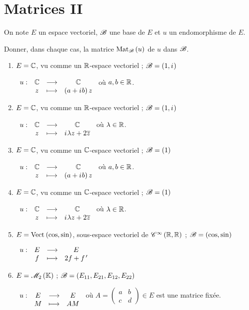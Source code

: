 \chapter{Matrices II}

\minitoc

\begin{exo}[Exercice 1]
On note \(E\) un espace vectoriel, \(\fami{B}\) une base de \(E\) et \(u\) un endomorphisme de \(E\).

Donner, dans chaque cas, la matrice \(\Mat{u}\) de \(u\) dans \(\fami{B}\).

\begin{enumerate}
\item \(E=\C\), vu comme un \(\R\)-espace vectoriel ; \(\fami{B}=\paren{1,\i}\)

\(\fonction{u}{\C}{\C}{z}{\paren{a+\i b}z}\) où \(a,b\in\R\). \\

\item \(E=\C\), vu comme un \(\R\)-espace vectoriel ; \(\fami{B}=\paren{1,\i}\)

\(\fonction{u}{\C}{\C}{z}{\i\lambda z+2\conj{z}}\) où \(\lambda\in\R\). \\

\item \(E=\C\), vu comme un \(\C\)-espace vectoriel ; \(\fami{B}=\paren{1}\)

\(\fonction{u}{\C}{\C}{z}{\paren{a+\i b}z}\) où \(a,b\in\R\). \\

\item \(E=\C\), vu comme un \(\C\)-espace vectoriel ; \(\fami{B}=\paren{1}\)

\(\fonction{u}{\C}{\C}{z}{\i\lambda z+2\conj{z}}\) où \(\lambda\in\R\). \\

\item \(E=\Vect{\cos,\sin}\), sous-espace vectoriel de \(\ensclasse{\infty}{\R}{\R}\) ; \(\fami{B}=\paren{\cos,\sin}\)

\(\fonction{u}{E}{E}{f}{2f+f\prim}\) \\

\item \(E=\M{2}\) ; \(\fami{B}=\paren{E_{11},E_{21},E_{12},E_{22}}\)

\(\fonction{u}{E}{E}{M}{AM}\) où \(A=\begin{pmatrix}
a & b \\
c & d
\end{pmatrix}\in E\) est une matrice fixée. \\


\end{enumerate}
\end{exo}
